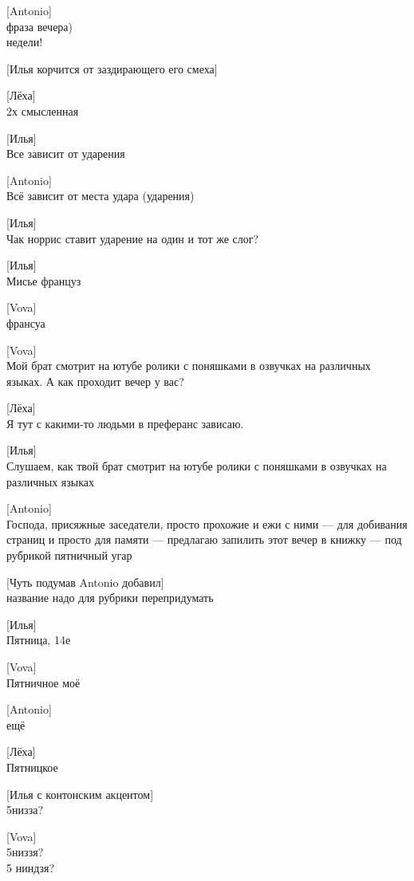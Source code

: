 [Antonio]\\
фраза вечера)\\
недели!


[Илья корчится от заздирающего его смеха]


[Лёха]\\
2х смысленная


[Илья]\\
Все зависит от ударения


[Antonio]\\
Всё зависит от места удара (ударения)


[Илья]\\
Чак норрис ставит ударение на один и тот же слог?


[Илья]\\
Мисье француз


[Vova]\\
франсуа


[Vova]\\
Мой брат смотрит на ютубе ролики с поняшками в озвучках на различных языках. А как проходит вечер у вас?


[Лёха]\\
Я тут с какими-то людьми в преферанс зависаю.


[Илья]\\
Слушаем, как твой брат смотрит на ютубе ролики с поняшками в озвучках на различных языках


[Antonio]\\
Господа, присяжные заседатели, просто прохожие и ежи с ними --- для добивания страниц и просто для памяти --- предлагаю запилить этот вечер в книжку --- под рубрикой пятничный угар


[Чуть подумав Antonio добавил]\\
название надо для рубрики перепридумать


[Илья]\\
Пятница, 14е


[Vova]\\
Пятничное моё


[Antonio]\\
ещё


[Лёха]\\
Пятницкое


[Илья с контонским акцентом]\\
5низза?


[Vova]\\
5низзя?\\
5 ниндзя?\\


